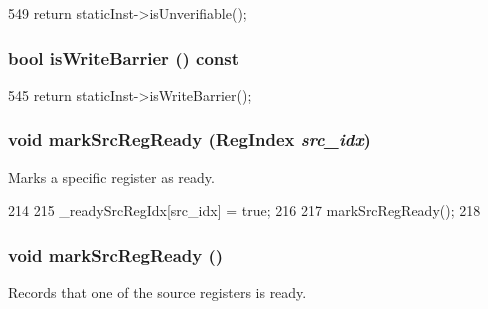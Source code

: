 \begin{DoxyCode}
549 { return staticInst->isUnverifiable(); }
\end{DoxyCode}
\hypertarget{classBaseDynInst_aadc753a9e3a0d5bb33b6551fb3ad5f7e}{
\subsubsection[{isWriteBarrier}]{\setlength{\rightskip}{0pt plus 5cm}bool isWriteBarrier () const}}
\label{classBaseDynInst_aadc753a9e3a0d5bb33b6551fb3ad5f7e}



\begin{DoxyCode}
545 { return staticInst->isWriteBarrier(); }
\end{DoxyCode}
\hypertarget{classBaseDynInst_a20a741d6245dcbf24bb3bc167946e1ec}{
\subsubsection[{markSrcRegReady}]{\setlength{\rightskip}{0pt plus 5cm}void markSrcRegReady ({\bf RegIndex} {\em src\_\-idx})}}
\label{classBaseDynInst_a20a741d6245dcbf24bb3bc167946e1ec}
Marks a specific register as ready. 


\begin{DoxyCode}
214 {
215     _readySrcRegIdx[src_idx] = true;
216 
217     markSrcRegReady();
218 }
\end{DoxyCode}
\hypertarget{classBaseDynInst_acd6444fdff2557922a35895eccab2d0f}{
\subsubsection[{markSrcRegReady}]{\setlength{\rightskip}{0pt plus 5cm}void markSrcRegReady ()}}
\label{classBaseDynInst_acd6444fdff2557922a35895eccab2d0f}
Records that one of the source registers is ready. 


